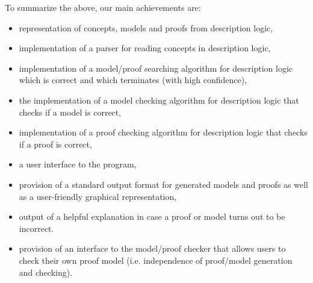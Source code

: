To summarize the above, our main achievements are:
\begin{itemize}
\item representation of concepts, models and proofs from description logic,
\item implementation of a parser for reading concepts in description logic,
\item implementation of a model/proof searching algorithm for description logic which is correct and which terminates (with high confidence),
\item the implementation of a model checking algorithm for description logic that checks if a model is correct,
\item implementation of a proof checking algorithm for description logic that checks if a proof is correct,
\item a user interface to the program,
\item provision of a standard output format for generated models and proofs as well as a user-friendly graphical representation,
\item output of a helpful explanation in case a proof or model turns out to be incorrect.
\item provision of an interface to the model/proof checker that allows users to check their own proof model (i.e. independence of proof/model generation and checking).
\end{itemize}